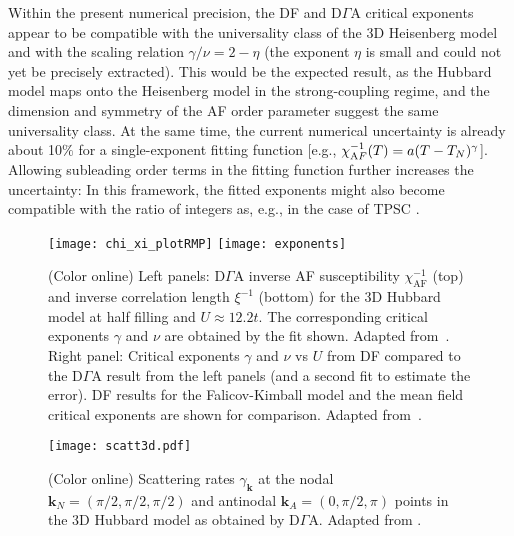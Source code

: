 \documentclass[rmp,aps,reprint,amsmath,amssymb,superscriptaddress,showpacs,nofootinbib]{revtex4-1}
\begin{document}
Within the present numerical precision, the DF and D$\Gamma$A critical exponents appear to be compatible with the universality class of the 3D Heisenberg model~\cite{Holm1993} and with the scaling relation $\gamma/\nu=2-\eta$ (the  exponent $\eta$ is small and could not yet be precisely extracted). This would be the expected result, as the Hubbard model maps onto the Heisenberg model in the strong-coupling regime, and the dimension and symmetry of the AF order parameter suggest the same universality class. At the same time, the current numerical uncertainty is already about 10$\%$ for a single-exponent fitting function [e.g., $\chi_{\text AF}^{-1}(T)= a (T- T_N)^\gamma$]. Allowing subleading order terms \cite{Semon2012} in the fitting function further increases the uncertainty: In this framework, the fitted exponents might also become compatible with the ratio of integers as, e.g., in the case of TPSC \cite{Dare2000}.

\begin{figure}[t]
  \hspace{-.23em}\texttt{[image: chi\_xi\_plotRMP]}
  \hspace{.28cm} \texttt{[image: exponents]}
    \caption{(Color online) Left panels:  D$\Gamma$A inverse AF susceptibility $\chi_{\text{AF}}^{-1}$ (top) and inverse correlation length $\xi^{-1}$ (bottom) for  the 3D Hubbard model at half filling and $U\approx 12.2t$. The corresponding critical exponents $\gamma$ and $\nu$ are obtained by the fit shown. Adapted from~. Right panel: Critical exponents  $\gamma$ and $\nu$  vs   $U$ from  DF compared to the D$\Gamma$A result  from the left panels (and a second fit to estimate the error). DF results for the Falicov-Kimball model and the mean field critical exponents are shown for comparison. Adapted from~.}
  \label{fig:exponents} 
\end{figure}

\begin{figure}[b]
  \texttt{[image: scatt3d.pdf]} 
    \caption{(Color online) Scattering rates $\gamma_{\mathbf{k}}$ at the nodal $\mathbf{k}_N = (\pi/2,\pi/2,\pi/2)$ and antinodal $\mathbf{k}_A = (0, \pi/2, \pi)$ points in the 3D Hubbard model as obtained by D$\Gamma$A. Adapted from .}
  \label{fig:scatt3d}
\end{figure}
\end{document}

